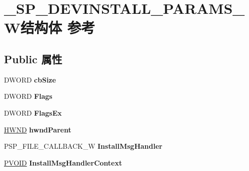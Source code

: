 \hypertarget{struct___s_p___d_e_v_i_n_s_t_a_l_l___p_a_r_a_m_s___w}{}\section{\+\_\+\+S\+P\+\_\+\+D\+E\+V\+I\+N\+S\+T\+A\+L\+L\+\_\+\+P\+A\+R\+A\+M\+S\+\_\+\+W结构体 参考}
\label{struct___s_p___d_e_v_i_n_s_t_a_l_l___p_a_r_a_m_s___w}
\subsection*{Public 属性}
\begin{DoxyCompactItemize}
\item 
\mbox{\label{struct___s_p___d_e_v_i_n_s_t_a_l_l___p_a_r_a_m_s___w_a1b19523e5a19c20b1c739ba4a3b952c3}} 
D\+W\+O\+RD {\bfseries cb\+Size}
\item 
\mbox{\label{struct___s_p___d_e_v_i_n_s_t_a_l_l___p_a_r_a_m_s___w_ac9fb04038eb849962d53177e93928ecd}} 
D\+W\+O\+RD {\bfseries Flags}
\item 
\mbox{\label{struct___s_p___d_e_v_i_n_s_t_a_l_l___p_a_r_a_m_s___w_a2fbaa19f036253ddcf3ed39da9066545}} 
D\+W\+O\+RD {\bfseries Flags\+Ex}
\item 
\mbox{\label{struct___s_p___d_e_v_i_n_s_t_a_l_l___p_a_r_a_m_s___w_ae39a84d8c29403bd94486454d6b237be}} 
\hyperlink{interfacevoid}{H\+W\+ND} {\bfseries hwnd\+Parent}
\item 
\mbox{\label{struct___s_p___d_e_v_i_n_s_t_a_l_l___p_a_r_a_m_s___w_aea2ca1fbdd25a040d73954042819fb70}} 
P\+S\+P\+\_\+\+F\+I\+L\+E\+\_\+\+C\+A\+L\+L\+B\+A\+C\+K\+\_\+W {\bfseries Install\+Msg\+Handler}
\item 
\mbox{\label{struct___s_p___d_e_v_i_n_s_t_a_l_l___p_a_r_a_m_s___w_a990627ab77feb1a6ec644e95f7124955}} 
\hyperlink{interfacevoid}{P\+V\+O\+ID} {\bfseries Install\+Msg\+Handler\+Context}

\end{DoxyCompactItemize}
